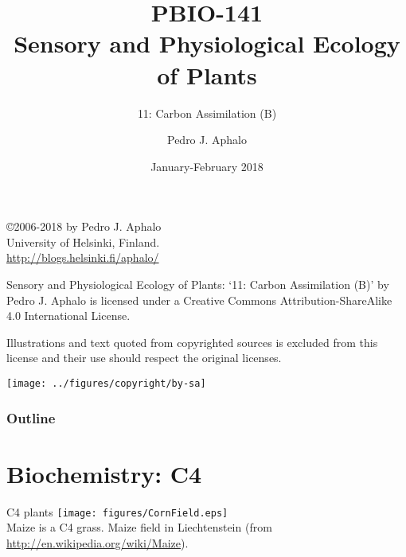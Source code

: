 \documentclass[10pt]{beamer}
\begin{document}
\title{PBIO-141\\Sensory and Physiological Ecology of  Plants}
\subtitle{11: Carbon Assimilation (B)}
\author{Pedro J. Aphalo}
\date{January-February 2018}


  \begin{frame}
    \maketitle
  \end{frame}

  \begin{frame}[c]
    \begin{center}
      \begin{small}
        \copyright 2006-2018 by Pedro J. Aphalo\\
       University of Helsinki, Finland.\\
        \textcolor{blue}{\url{http://blogs.helsinki.fi/aphalo/}}\\[2ex]
      \end{small}

      \begin{footnotesize}
        Sensory and Physiological Ecology of  Plants: `11: Carbon Assimilation (B)' by Pedro J. Aphalo is licensed under a Creative Commons Attribution-ShareAlike 4.0 International License.

        Illustrations and text quoted from copyrighted sources is excluded from this license and their use should respect the original licenses.\\[2ex]
      \end{footnotesize}

      \texttt{[image: ../figures/copyright/by-sa]}
    \end{center}
  \end{frame}

  \begin{frame}
    \frametitle{Outline}
    \tableofcontents
  \end{frame}

\section{Biochemistry: C4}

\begin{frame}{C4 plants}
    \centering
    \texttt{[image: figures/CornField.eps]}\\
    {\small Maize is a C4 grass. Maize field in Liechtenstein (from \url{http://en.wikipedia.org/wiki/Maize}).}
\end{frame}
\end{document}
